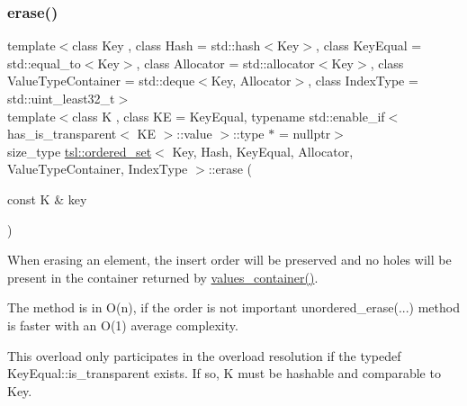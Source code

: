 \subsubsection{\texorpdfstring{erase()}{erase()}\hspace{0.1cm}{\footnotesize\ttfamily [6/7]}}
{\footnotesize\ttfamily template$<$class Key , class Hash  = std\+::hash$<$\+Key$>$, class Key\+Equal  = std\+::equal\+\_\+to$<$\+Key$>$, class Allocator  = std\+::allocator$<$\+Key$>$, class Value\+Type\+Container  = std\+::deque$<$\+Key, Allocator$>$, class Index\+Type  = std\+::uint\+\_\+least32\+\_\+t$>$ \\
template$<$class K , class KE  = Key\+Equal, typename std\+::enable\+\_\+if$<$ has\+\_\+is\+\_\+transparent$<$ K\+E $>$\+::value $>$\+::type $\ast$  = nullptr$>$ \\
size\+\_\+type \mbox{\hyperlink{classtsl_1_1ordered__set}{tsl\+::ordered\+\_\+set}}$<$ Key, Hash, Key\+Equal, Allocator, Value\+Type\+Container, Index\+Type $>$\+::erase (\begin{DoxyParamCaption}\item[{const K \&}]{key }\end{DoxyParamCaption})\hspace{0.3cm}{\ttfamily [inline]}}





When erasing an element, the insert order will be preserved and no holes will be present in the container returned by \textquotesingle{}\mbox{\hyperlink{classtsl_1_1ordered__set_a1bc951514a5c4c29c14b6cf5177cf1ec}{values\+\_\+container()}}\textquotesingle{}.

The method is in O(n), if the order is not important \textquotesingle{}unordered\+\_\+erase(...)\textquotesingle{} method is faster with an O(1) average complexity.

This overload only participates in the overload resolution if the typedef Key\+Equal\+::is\+\_\+transparent exists. If so, K must be hashable and comparable to Key. \mbox{\label{classtsl_1_1ordered__set_a7e0e6377f984cd852e8861174fc28786}} 
